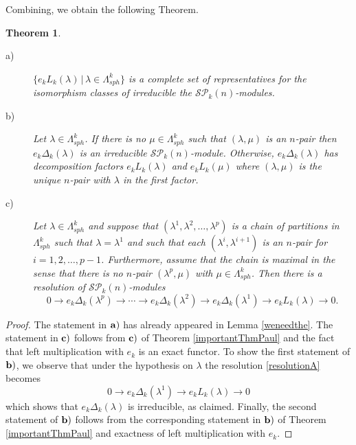 \documentclass[10pt,hidelinks]{article}
\newcommand{\SpheAlg}{{\mathcal{SP} }_{k}}
\newtheorem{theorem}{Theorem}
\numberwithin{equation}{section}
\begin{document}
\medskip
Combining, we obtain the following Theorem.
\begin{theorem}
\label{mainThm}
\begin{description}
  \item[a)] $ \{  e_k L_k(\lambda)  \, | \,  \lambda \in \Lambda_{sph}^{k} \} $ is a complete set of representatives for the
  isomorphism classes of irreducible the $ \SpheAlg(n) $-modules.
  \item[b)] Let $ \lambda \in \Lambda_{sph}^k$. If there is no $ \mu \in \Lambda_{sph}^k $ such that $ (\lambda, \mu ) $ is an $n$-pair then
    $ e_k\Delta_k(\lambda) $ is an irreducible $ \SpheAlg(n) $-module.
    Otherwise, $ e_k\Delta_k(\lambda) $ has decomposition factors $ e_kL_k(\lambda) $ and
    $ e_kL_k(\mu) $ where $ (\lambda, \mu ) $ is the unique $n$-pair with $ \lambda $ in the first factor. 
  \item[c)] Let $ \lambda \in \Lambda_{sph}^k $ and suppose that $ (\lambda^1, \lambda^2, \ldots, \lambda^p) $
    is a chain of partitions in $ \Lambda_{sph}^k$ such that $ \lambda= \lambda^1 $ and such that each $ (\lambda^i, \lambda^{i+1}) $ is an $n$-pair
    for $ i =1,2,\ldots, p-1$. Furthermore, assume that the chain is maximal in the sense that there is no $n$-pair $ (\lambda^p, \mu) $
    with $ \mu \in \Lambda_{sph}^{k} $. Then there is a resolution of $ \SpheAlg(n)$-modules
    \begin{equation}\label{resolutionA}
      0 \rightarrow e_k\Delta_k(\lambda^p) \rightarrow \cdots \rightarrow e_k\Delta_k(\lambda^2)\rightarrow e_k\Delta_k(\lambda^1 ) \rightarrow e_kL_k(\lambda  )
\rightarrow 0.
    \end{equation}    
  \end{description}
  
\end{theorem}
\begin{proof}
  The statement in ${ \bf a)} $ has already appeared in Lemma \ref{weneedthe}. The statement in ${ \bf c)} $
  follows from ${ \bf c)} $ of Theorem \ref{importantThmPaul} and the fact that left multiplication with $ e_k$ is
  an exact functor. To show the first statement of ${ \bf b)} $, we observe that under the hypothesis on $ \lambda $ the resolution
  \eqref{resolutionA} becomes 
    \begin{equation}\label{resolutionshoert}
      0 \rightarrow e_k\Delta_k(\lambda^1 ) \rightarrow e_kL_k(\lambda  )
\rightarrow 0
    \end{equation}
    which shows that $   e_k\Delta_k(\lambda ) $ is irreducible, as claimed. Finally, the second statement of
    ${ \bf b)} $ follows from the corresponding statement in ${ \bf b)} $ of Theorem \ref{importantThmPaul} and
    exactness of left multiplication with $e_k$.
\end{proof}
\end{document}
